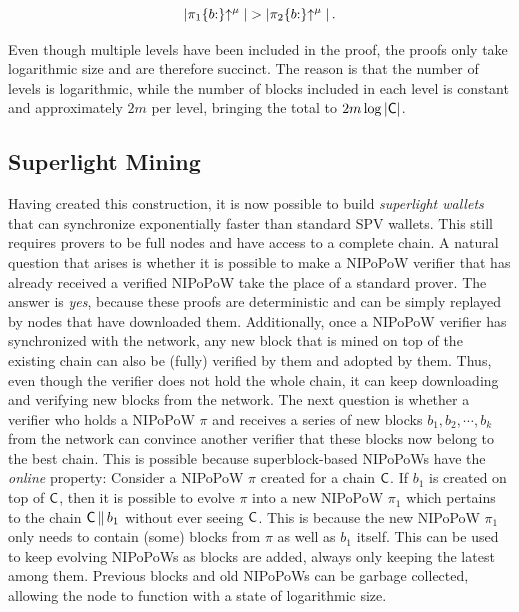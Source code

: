\[
|\pi_1\{b{:}\}\negthickspace\uparrow^\mu| > |\pi_2\{b{:}\}\negthickspace\uparrow^\mu|
\,.
\]

Even though multiple levels have been included in the proof, the proofs only
take logarithmic size and are therefore succinct. The reason is that the number
of levels is logarithmic, while the number of blocks included in each level is
constant and approximately $2m$ per level, bringing the total to
$2m\log|\mathsf{C}|$.


\subsection{Superlight Mining}
Having created this construction, it is now possible to build \emph{superlight
wallets} that can synchronize exponentially faster than standard SPV wallets.
This still requires provers to be full nodes and have access to a complete
chain. A natural question that arises is whether it is possible to make a
NIPoPoW verifier that has already received a verified NIPoPoW take the place of
a standard prover. The answer is \emph{yes}, because these proofs are
deterministic and can be simply replayed by nodes that have downloaded them.
Additionally, once a NIPoPoW verifier has synchronized with the network, any new
block that is mined on top of the existing chain can also be (fully) verified by
them and adopted by them. Thus, even though the verifier does not hold the whole
chain, it can keep downloading and verifying new blocks from the network. The
next question is whether a verifier who holds a NIPoPoW $\pi$ and receives a
series of new blocks $b_1, b_2, \cdots, b_k$ from the network can convince
another verifier that these blocks now belong to the best chain. This is
possible because superblock-based NIPoPoWs have the \emph{online} property:
Consider a NIPoPoW $\pi$ created for a chain $\mathsf{C}$. If $b_1$ is created on
top of $\mathsf{C}$, then it is possible to evolve $\pi$ into a new NIPoPoW $\pi_1$
which pertains to the chain $\mathsf{C} \,\|\, b_1$ without ever seeing $\mathsf{C}$.
This is because the new NIPoPoW $\pi_1$ only needs to contain (some) blocks from
$\pi$ as well as $b_1$ itself. This can be used to keep evolving NIPoPoWs as
blocks are added, always only keeping the latest among them. Previous blocks
and old NIPoPoWs can be garbage collected, allowing the node to function with a
state of logarithmic size.

